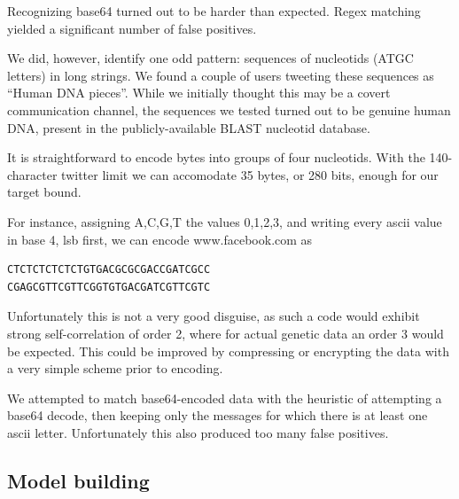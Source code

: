 \documentclass[a4paper,11pt]{article}
\begin{document}
Recognizing base64 turned out to be harder than expected. Regex matching yielded a significant number of false positives.

We did, however, identify one odd pattern: sequences of nucleotids (ATGC letters) in long strings. We found a couple of users tweeting these sequences as ``Human DNA pieces''. While we initially thought this may be a covert communication channel, the sequences we tested turned out to be genuine human DNA, present in the publicly-available BLAST nucleotid database.


It is straightforward to encode bytes into groups of four nucleotids. With the 140-character twitter limit we can accomodate 35 bytes, or 280 bits, enough for our target bound.

For instance, assigning A,C,G,T the values 0,1,2,3, and writing every ascii value in base 4, lsb first, we can encode www.facebook.com as
\begin{verbatim}
CTCTCTCTCTCTGTGACGCGCGACCGATCGCC
CGAGCGTTCGTTCGGTGTGACGATCGTTCGTC
\end{verbatim}

Unfortunately this is not a very good disguise, as such a code
would exhibit strong self-correlation of order 2, where for actual genetic data an order 3 would be expected. This could be improved
by compressing or encrypting the data with a very simple scheme prior to encoding.


We attempted to match base64-encoded data with the heuristic of attempting a base64 decode, then keeping only the messages for which there is at least one ascii letter. Unfortunately this also produced too many false positives.



\subsection{Model building}
\end{document}
